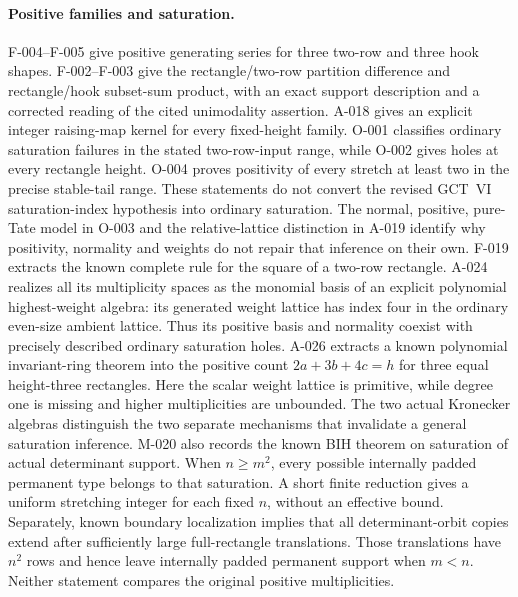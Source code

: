 \documentclass[11pt]{article}
\begin{document}
\paragraph{Positive families and saturation.}
F-004--F-005 give positive generating series for three two-row
and three hook shapes. F-002--F-003 give the rectangle/two-row
partition difference and rectangle/hook subset-sum product, with an
exact support description and a corrected reading of the cited
unimodality assertion. A-018 gives an explicit integer raising-map
kernel for every fixed-height family. O-001 classifies ordinary
saturation failures in the stated two-row-input range, while O-002
gives holes at every rectangle height. O-004 proves positivity of
every stretch at least two in the precise stable-tail range.
These statements do not convert the revised GCT~VI saturation-index
hypothesis into ordinary saturation. The normal, positive, pure-Tate
model in O-003 and the relative-lattice distinction in A-019
identify why positivity, normality and weights do not repair that
inference on their own. F-019 extracts the known complete rule for
the square of a two-row rectangle. A-024 realizes all its multiplicity
spaces as the monomial basis of an explicit polynomial highest-weight
algebra: its generated weight lattice has index four in the ordinary
even-size ambient lattice. Thus its positive basis and normality
coexist with precisely described ordinary saturation holes.
A-026 extracts a known polynomial invariant-ring theorem into the
positive count \(2a+3b+4c=h\) for three equal height-three
rectangles. Here the scalar weight lattice is primitive, while
degree one is missing and higher multiplicities are unbounded.
The two actual Kronecker algebras distinguish the two separate
mechanisms that invalidate a general saturation inference.
M-020 also records the known BIH theorem on saturation of actual
determinant support. When \(n\geq m^2\), every possible internally
padded permanent type belongs to that saturation. A short finite
reduction gives a uniform stretching integer for each fixed \(n\),
without an effective bound. Separately, known boundary localization
implies that all determinant-orbit copies extend after sufficiently
large full-rectangle translations. Those translations have \(n^2\)
rows and hence leave internally padded permanent support when \(m<n\).
Neither statement compares the original positive multiplicities.
\end{document}
